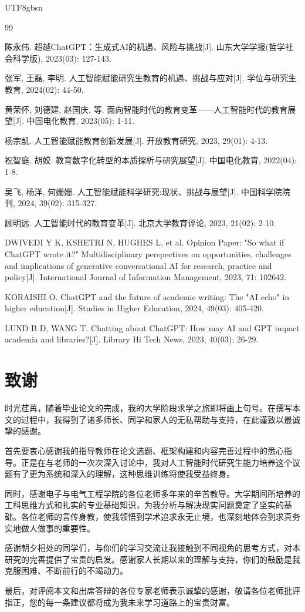 \documentclass[12pt,a4paper]{article}
\begin{document}
\begin{CJK}{UTF8}{gbsn}
\newpage
\begin{thebibliography}{99}

 陈永伟. 超越ChatGPT：生成式AI的机遇、风险与挑战[J]. 山东大学学报(哲学社会科学版), 2023(03): 127-143.

 张军, 王磊, 李明. 人工智能赋能研究生教育的机遇、挑战与应对[J]. 学位与研究生教育, 2024(02): 44-50.

 黄荣怀, 刘德建, 赵国庆, 等. 面向智能时代的教育变革——人工智能时代的教育展望[J]. 中国电化教育, 2023(05): 1-11.

 杨宗凯. 人工智能赋能教育创新发展[J]. 开放教育研究, 2023, 29(01): 4-13.

 祝智庭, 胡姣. 教育数字化转型的本质探析与研究展望[J]. 中国电化教育, 2022(04): 1-8.

 吴飞, 杨洋, 何姗姗. 人工智能赋能科学研究:现状、挑战与展望[J]. 中国科学院院刊, 2024, 39(02): 315-327.

 顾明远. 人工智能时代的教育变革[J]. 北京大学教育评论, 2023, 21(02): 2-10.

 DWIVEDI Y K, KSHETRI N, HUGHES L, et al. Opinion Paper: "So what if ChatGPT wrote it?" Multidisciplinary perspectives on opportunities, challenges and implications of generative conversational AI for research, practice and policy[J]. International Journal of Information Management, 2023, 71: 102642.

 KORAISHI O. ChatGPT and the future of academic writing: The "AI echo" in higher education[J]. Studies in Higher Education, 2024, 49(03): 405-420.

 LUND B D, WANG T. Chatting about ChatGPT: How may AI and GPT impact academia and libraries?[J]. Library Hi Tech News, 2023, 40(03): 26-29.

\end{thebibliography}

\newpage
\section*{致\quad 谢}

时光荏苒，随着毕业论文的完成，我的大学阶段求学之旅即将画上句号。在撰写本文的过程中，我得到了诸多师长、同学和家人的无私帮助与支持，在此谨致以最诚挚的感谢。

首先要衷心感谢我的指导教师在论文选题、框架构建和内容完善过程中的悉心指导。正是在与老师的一次次深入讨论中，我对人工智能时代研究生能力培养这个议题有了更为系统和深入的理解，这种思维训练将使我受益终身。

同时，感谢电子与电气工程学院的各位老师多年来的辛苦教导。大学期间所培养的工科思维方式和扎实的专业基础知识，为我分析与解决现实问题奠定了坚实的基础。各位老师的言传身教，使我领悟到学术追求永无止境，也深刻地体会到求真务实地做人做事的重要性。

感谢朝夕相处的同学们，与你们的学习交流让我接触到不同视角的思考方式，对本研究的完善提供了宝贵的启发。感谢家人长期以来的理解与支持，你们的鼓励是我克服困难、不断前行的不竭动力。

最后，对评阅本文和出席答辩的各位专家老师表示诚挚的感谢，敬请各位老师批评指正，您的每一条建议都将成为我未来学习道路上的宝贵财富。

\end{CJK}
\end{document}
